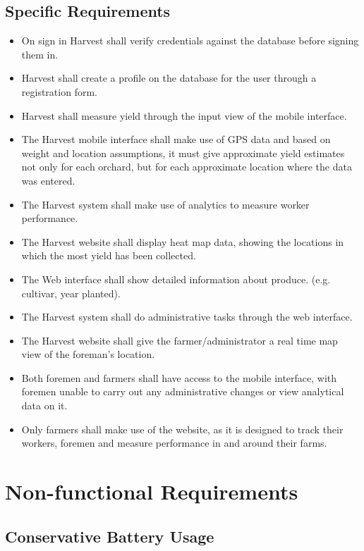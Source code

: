 \documentclass[11pt]{article}
\begin{document}
\subsection{Specific Requirements}
\begin{itemize}
  \item On sign in Harvest shall verify credentials against the database before signing them in.
  \item Harvest shall create a profile on the database for the user through a registration form.
  \item Harvest shall measure yield through the input view of the mobile interface.
  \item The Harvest mobile interface shall make use of GPS data and based on weight and location assumptions, it must give approximate yield estimates not only for each orchard, but for each approximate location where the data was entered.
  \item The Harvest system shall make use of analytics to measure worker performance.
  \item The Harvest website shall display heat map data, showing the locations in which the most yield has been collected.
  \item The Web interface shall show detailed information about produce. (e.g. cultivar, year planted).
  \item The Harvest system shall do administrative tasks through the web interface.
  \item The Harvest website shall give the farmer/administrator a real time map view of the foreman's location.
  \item Both foremen and farmers shall have access to the mobile interface, with foremen unable to carry out any administrative changes or view analytical data on it.
  \item Only farmers shall make use of the website, as it is designed to track their workers, foremen and measure performance in and around their farms.
\end{itemize}

\section{Non-functional Requirements}

\subsection{Conservative Battery Usage}
\end{document}
